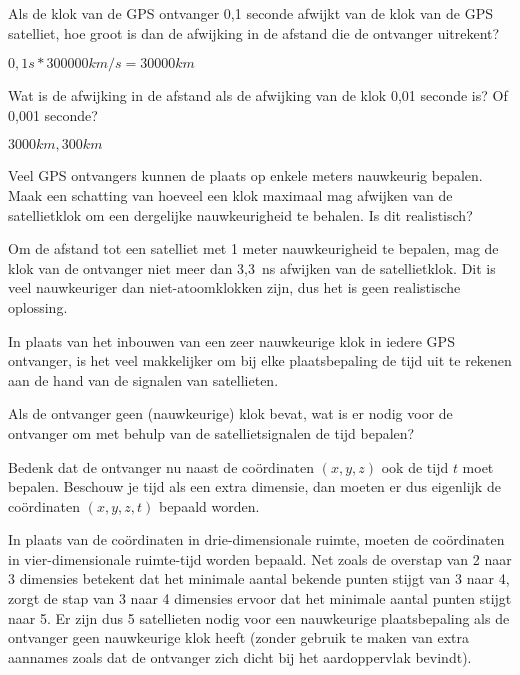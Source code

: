 \begin{opgave}
	\begin{subopgave}
		Als de klok van de GPS ontvanger 0,1 seconde afwijkt van de klok van de GPS satelliet, hoe groot is dan de afwijking in de afstand die de ontvanger uitrekent?
		\begin{antwoord}
			$0,1 s * 300000 km/s = 30000 km$
		\end{antwoord}
	\end{subopgave}
	\begin{subopgave}
		Wat is de afwijking in de afstand als de afwijking van de klok 0,01 seconde is? Of 0,001 seconde?
		\begin{antwoord}
			$3000 km, 300 km$
		\end{antwoord}
	\end{subopgave}
	\begin{subopgave}
		Veel GPS ontvangers kunnen de plaats op enkele meters nauwkeurig bepalen. Maak een schatting van hoeveel een klok maximaal mag afwijken van de satellietklok om een dergelijke nauwkeurigheid te behalen. Is dit realistisch?
		\begin{antwoord}
			Om de afstand tot een satelliet met 1 meter nauwkeurigheid te bepalen, mag de klok van de ontvanger niet meer dan 3,3~ns afwijken van de satellietklok. Dit is veel nauwkeuriger dan niet-atoomklokken zijn, dus het is geen realistische oplossing.
		\end{antwoord}
	\end{subopgave}
\end{opgave}

In plaats van het inbouwen van een zeer nauwkeurige klok in iedere GPS ontvanger, is het veel makkelijker om bij elke plaatsbepaling de tijd uit te rekenen aan de hand van de signalen van satellieten.

\begin{opgave}[\vinger\ster]
	Als de ontvanger geen (nauwkeurige) klok bevat, wat is er nodig voor de ontvanger om met behulp van de satellietsignalen de tijd bepalen?
	\begin{hint}
		Bedenk dat de ontvanger nu naast de co\"ordinaten $(x, y, z)$ ook de tijd $t$ moet bepalen. Beschouw je tijd als een extra dimensie, dan moeten er dus eigenlijk de co\"ordinaten $(x, y, z, t)$ bepaald worden.
	\end{hint}
	\begin{antwoord}
		In plaats van de co\"ordinaten in drie-dimensionale ruimte, moeten de co\"ordinaten in vier-dimensionale ruimte-tijd worden bepaald. Net zoals de overstap van 2 naar 3 dimensies betekent dat het minimale aantal bekende punten stijgt van 3 naar 4, zorgt de stap van 3 naar 4 dimensies ervoor dat het minimale aantal punten stijgt naar 5. Er zijn dus 5 satellieten nodig voor een nauwkeurige plaatsbepaling als de ontvanger geen nauwkeurige klok heeft (zonder gebruik te maken van extra aannames zoals dat de ontvanger zich dicht bij het aardoppervlak bevindt).
	\end{antwoord} 
\end{opgave}
